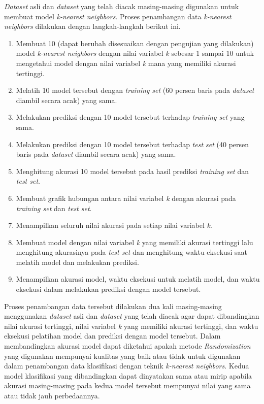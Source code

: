 \textit{Dataset} asli dan \textit{dataset} yang telah diacak masing-masing digunakan untuk membuat model \textit{k-nearest neighbors}. Proses penambangan data \textit{k-nearest neighbors} dilakukan dengan langkah-langkah berikut ini.
\begin{enumerate}
    \item Membuat 10 (dapat berubah disesuaikan dengan pengujian yang dilakukan) model \textit{k-nearest neighbors} dengan nilai variabel \textit{k} sebesar 1 sampai 10 untuk mengetahui model dengan nilai variabel \textit{k} mana yang memiliki akurasi tertinggi.
    \item Melatih 10 model tersebut dengan \textit{training set} (60 persen baris pada \textit{dataset} diambil secara acak) yang sama.
    \item Melakukan prediksi dengan 10 model tersebut terhadap \textit{training set} yang sama.
    \item Melakukan prediksi dengan 10 model tersebut terhadap \textit{test set} (40 persen baris pada \textit{dataset} diambil secara acak) yang sama.
    \item Menghitung akurasi 10 model tersebut pada hasil prediksi \textit{training set} dan \textit{test set}.
    \item Membuat grafik hubungan antara nilai variabel \textit{k} dengan akurasi pada \textit{training set} dan \textit{test set}.
    \item Menampilkan seluruh nilai akurasi pada setiap nilai variabel \textit{k}.
    \item Membuat model dengan nilai variabel \textit{k} yang memiliki akurasi tertinggi lalu menghitung akurasinya pada \textit{test set} dan menghitung waktu eksekusi saat melatih model dan melakukan prediksi.
    \item Menampilkan akurasi model, waktu eksekusi untuk melatih model, dan waktu eksekusi dalam melakukan prediksi dengan model tersebut.
\end{enumerate}
Proses penambangan data tersebut dilakukan dua kali masing-masing menggunakan \textit{dataset} asli dan \textit{dataset} yang telah diacak agar dapat dibandingkan nilai akurasi tertinggi, nilai variabel \textit{k} yang memiliki akurasi tertinggi, dan waktu eksekusi pelatihan model dan prediksi dengan model tersebut. Dalam membandingkan akurasi model dapat diketahui apakah metode \textit{Randomization} yang digunakan mempunyai kualitas yang baik atau tidak untuk digunakan dalam penambangan data klasifikasi dengan teknik \textit{k-nearest neighbors}. Kedua model klasifikasi yang dibandingkan dapat dinyatakan sama atau mirip apabila akurasi masing-masing pada kedua model tersebut mempunyai nilai yang sama atau tidak jauh perbedaannya.

